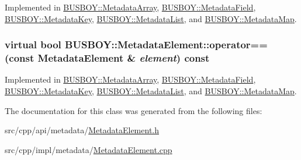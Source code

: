 Implemented in \hyperlink{classBUSBOY_1_1MetadataArray_a62365009f5370b749639004ff5c93096}{BUSBOY::MetadataArray}, \hyperlink{classBUSBOY_1_1MetadataField_a112861961d422cf5613e67cea2eb49e6}{BUSBOY::MetadataField}, \hyperlink{classBUSBOY_1_1MetadataKey_aa87f34cefe429a511ee280c29a9de761}{BUSBOY::MetadataKey}, \hyperlink{classBUSBOY_1_1MetadataList_a224d6c162a01e42b6262335a9ef139dd}{BUSBOY::MetadataList}, and \hyperlink{classBUSBOY_1_1MetadataMap_a161a2e429cc1b2fd40fac48222a9b90b}{BUSBOY::MetadataMap}.\hypertarget{classBUSBOY_1_1MetadataElement_ac56f20521c49259ff043c2d69bc4c08e}{
\subsubsection[{operator==}]{\setlength{\rightskip}{0pt plus 5cm}virtual bool BUSBOY::MetadataElement::operator== (const {\bf MetadataElement} \& {\em element}) const}}
\label{classBUSBOY_1_1MetadataElement_ac56f20521c49259ff043c2d69bc4c08e}


Implemented in \hyperlink{classBUSBOY_1_1MetadataArray_a6105a539099289a76db6524c926ea551}{BUSBOY::MetadataArray}, \hyperlink{classBUSBOY_1_1MetadataField_a8fc0a215619adb2f2f7eca8167211cca}{BUSBOY::MetadataField}, \hyperlink{classBUSBOY_1_1MetadataKey_afc2527147e8aacc0368eaeb67ae8d1dc}{BUSBOY::MetadataKey}, \hyperlink{classBUSBOY_1_1MetadataList_a7dbea89ac583ce3f8900474f22aba2de}{BUSBOY::MetadataList}, and \hyperlink{classBUSBOY_1_1MetadataMap_ae8a5e06c1baa5231744a7b98d49a37f7}{BUSBOY::MetadataMap}.

The documentation for this class was generated from the following files:\begin{DoxyCompactItemize}
\item 
src/cpp/api/metadata/\hyperlink{MetadataElement_8h}{MetadataElement.h}\item 
src/cpp/impl/metadata/\hyperlink{MetadataElement_8cpp}{MetadataElement.cpp}\end{DoxyCompactItemize}
